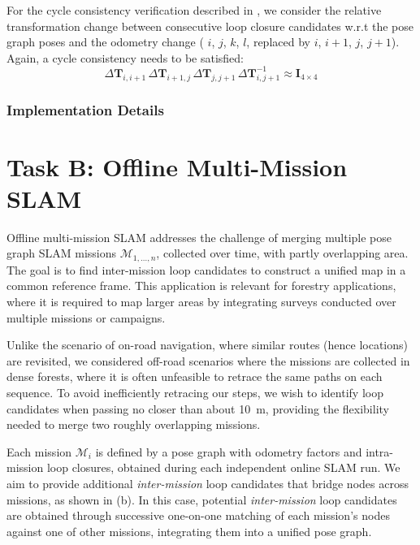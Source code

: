 For the cycle consistency verification described in , we consider the relative transformation change between consecutive loop closure candidates w.r.t the pose graph poses and the odometry change (  $i$, $j$, $k$, $l$, replaced by ${i}$, ${i+1}$, ${j}$, ${j+1}$). Again, a cycle consistency needs to be satisfied:
\begin{equation}
  \label{eq:cycle-online}
  \Delta\mathbf{T}_{i,i+1}\, \Delta\mathbf{T}_{i+1, j}\, \Delta\mathbf{T}_{j, j+1}\, \Delta\mathbf{T}_{i, j+1}^{-1} \approx \mathbf{I}_{4\times4}
\end{equation}

\subsubsection*{Implementation Details}

\section{Task B: Offline Multi-Mission SLAM}\label{sec:offline}
Offline multi-mission SLAM addresses the challenge of merging multiple pose graph SLAM missions ${\mathcal{M}_{1, \ldots, n}}$, collected over time, with partly overlapping area. 
The goal is to find inter-mission loop candidates to construct a unified map in a common reference frame. This application is relevant for forestry applications, where it is required to map larger areas by integrating surveys conducted over multiple missions or campaigns.

Unlike the scenario of on-road navigation, where similar routes (hence locations) are revisited, we considered off-road scenarios where the missions are collected in dense forests, where it is often unfeasible to retrace the same paths on each sequence. To avoid inefficiently retracing our steps, we wish to identify loop candidates when passing no closer than about \SI{10}{\meter}, providing the flexibility needed to merge two roughly overlapping missions.

Each mission ${\mathcal{M}_{i}}$ is defined by a pose graph with odometry factors and intra-mission loop closures, obtained during each independent online SLAM run. We aim to provide additional \emph{inter-mission} loop candidates that bridge nodes across missions, as shown in  (b). In this case, potential \emph{inter-mission} loop candidates are obtained through successive one-on-one matching of each mission's nodes against one of other missions, integrating them into a unified pose graph.

